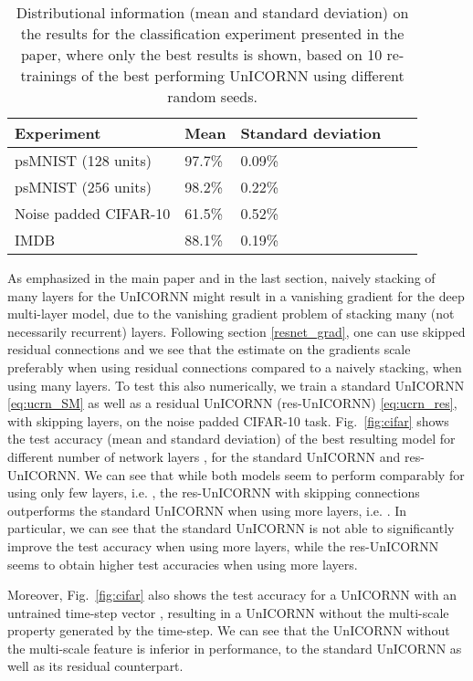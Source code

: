 \documentclass{article}
\newcommand{\fref}[1] {Fig.~\ref{#1}}
\begin{document}
\begin{table}[h!]
  \caption{Distributional information (mean and standard deviation) on the results for the classification experiment presented in the paper, where only the best results is shown, based on 10 re-trainings of the best performing UnICORNN using different random seeds.}
  \label{tab:distr_results}
  \centering
  \begin{tabular}{lllll}
    \toprule
    \cmidrule(r){1-3}
    Experiment & Mean & Standard deviation \\
        \midrule
    psMNIST (128 units) & 97.7\% &  0.09\%\\
    psMNIST (256 units) & 98.2\% & 0.22\% \\
    Noise padded CIFAR-10 & 61.5\% & 0.52\%\\
    IMDB & 88.1\% & 0.19\% \\
    \bottomrule
  \end{tabular}
\end{table}

As emphasized in the main paper and in the last section, naively stacking of many layers for the UnICORNN might result in a vanishing gradient for the deep multi-layer model, due to the vanishing gradient problem of stacking many (not necessarily recurrent) layers. Following section \ref{resnet_grad}, one can use skipped residual connections and we see that the estimate on the gradients scale preferably when using residual connections compared to a naively stacking, when using many layers. To test this also numerically, we train a standard UnICORNN \eqref{eq:ucrn_SM} as well as a residual UnICORNN (res-UnICORNN) \eqref{eq:ucrn_res}, with  skipping layers, on the noise padded CIFAR-10 task.  
\fref{fig:cifar} shows the test accuracy (mean and standard deviation) of the best resulting model for different number of network layers , for the standard UnICORNN and res-UnICORNN. We can see that while both models seem to perform comparably for using only few layers, i.e. , the res-UnICORNN with  skipping connections outperforms the standard UnICORNN when using more layers, i.e. . In particular, we can see that the standard UnICORNN is not able to significantly improve the test accuracy when using more layers, while the res-UnICORNN seems to obtain higher test accuracies when using more layers. 

Moreover, \fref{fig:cifar} also shows the test accuracy for a UnICORNN with an untrained time-step vector , resulting in a UnICORNN without the multi-scale property generated by the time-step. We can see that the UnICORNN without the multi-scale feature is inferior in performance, to the standard UnICORNN as well as its residual counterpart.   
\end{document}
